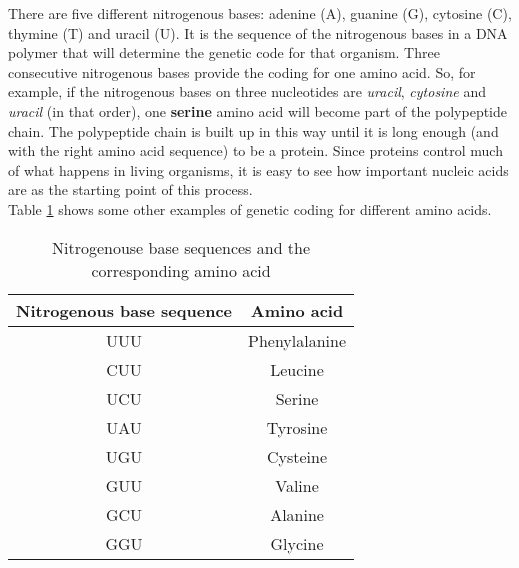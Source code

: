 There are five different nitrogenous bases: adenine (A), guanine (G), cytosine (C), thymine (T) and uracil (U). It is the sequence of the nitrogenous bases in a DNA polymer that will determine the genetic code for that organism. Three consecutive nitrogenous bases provide the coding for one amino acid. So, for example, if the nitrogenous bases on three nucleotides are \textit{uracil}, \textit{cytosine} and \textit{uracil} (in that order), one \textbf{serine} amino acid will become part of the polypeptide chain. The polypeptide chain is built up in this way until it is long enough (and with the right amino acid sequence) to be a protein. Since proteins control much of what happens in living organisms, it is easy to see how important nucleic acids are as the starting point of this process.\\


Table \ref{tab:amino acids} shows some other examples of genetic coding for different amino acids.\\

\begin{table}[h]
\begin{center}
\caption{Nitrogenouse base sequences and the corresponding amino acid}
\label{tab:amino acids}
\begin{tabular}{|c|c|}\hline
\textbf{Nitrogenous base sequence} & \textbf{Amino acid} \\\hline
UUU & Phenylalanine \\\hline
CUU & Leucine \\\hline
UCU & Serine \\\hline
UAU & Tyrosine \\\hline
UGU & Cysteine \\\hline
GUU & Valine \\\hline
GCU & Alanine \\\hline
GGU & Glycine \\\hline
\end{tabular}
\end{center}
\end{table}


